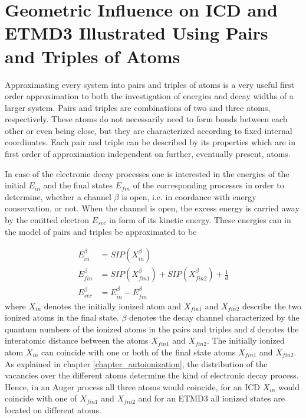 \chapter{Geometric Influence on ICD and ETMD3  Illustrated Using Pairs and Triples of Atoms}
Approximating every system into pairs and triples of atoms is a very useful
first order approximation to both the investigation of energies and
decay widths of a larger system. Pairs and triples are combinations of
two and three atoms, respectively.
These atoms do not necessarily need to form bonds between each other or
even being close, but they are characterized according to fixed internal
coordinates. Each pair and triple can be described by its properties
which are in first order of approximation independent on further, eventually
present, atoms.

In case of the electronic decay processes one is interested in the
energies of the initial $E_{in}$ and the final states $E_{fin}$ of
the corresponding processes in order to determine, whether a channel $\beta$
is open, i.e. in coordance with energy conservation, or not. When the channel
is open, the excess energy is carried away by the emitted electron $E_{sec}$
in form of its kinetic energy. These energies can in the model
of pairs and triples be approximated to be

\begin{align}
 E_{in}^\beta  &= SIP(X_{in}^\beta) \label{equation:E_in}\\
 E_{fin}^\beta &= SIP(X_{fin1}^\beta) + SIP(X_{fin2}^\beta) + \frac 1d
           \label{equation:E_fin}\\
 E_{sec}^\beta &= E_{in}^\beta - E_{fin}^\beta \label{equation:E_sec}
\end{align}
where $X_{in}$ denotes the initially ionized atom and
$X_{fin1}$ and $X_{fin2}$ describe the two ionized
atoms in the final state. $\beta$ denotes the decay channel characterized
by the quantum numbers of the ionized atoms in the pairs
and triples and $d$ denotes the interatomic distance between the atoms
$X_{fin1}$ and $X_{fin2}$. The initially ionized atom $X_{in}$ can
coincide with one or both of
the final state atoms
$X_{fin1}$ and $X_{fin2}$. As explained in
chapter \ref{chapter_autoionization}, the distribution
of the vacancies over the different
atoms determine the kind of electronic decay process. Hence, in an
Auger process all three atoms would coincide, for an ICD $X_{in}$
would coincide with one of $X_{fin1}$ and $X_{fin2}$ and for an \ac{ETMD}3
all ionized states are located on different atoms.

